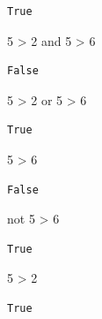 \documentclass[
  letterpaper,
  DIV=11,
  numbers=noendperiod]{scrreprt}
\newenvironment{Shaded}{\begin{snugshade}}{\end{snugshade}}
\newcommand{\DecValTok}[1]{\textcolor[rgb]{0.68,0.00,0.00}{#1}}
\newcommand{\KeywordTok}[1]{\textcolor[rgb]{0.00,0.23,0.31}{#1}}
\newcommand{\OperatorTok}[1]{\textcolor[rgb]{0.37,0.37,0.37}{#1}}
\begin{document}
\begin{verbatim}
True
\end{verbatim}

\begin{Shaded}
\begin{Highlighting}[]
\DecValTok{5} \OperatorTok{\textgreater{}} \DecValTok{2} \KeywordTok{and} \DecValTok{5} \OperatorTok{\textgreater{}} \DecValTok{6}
\end{Highlighting}
\end{Shaded}

\begin{verbatim}
False
\end{verbatim}

\begin{Shaded}
\begin{Highlighting}[]
\DecValTok{5} \OperatorTok{\textgreater{}} \DecValTok{2} \KeywordTok{or} \DecValTok{5} \OperatorTok{\textgreater{}} \DecValTok{6}
\end{Highlighting}
\end{Shaded}

\begin{verbatim}
True
\end{verbatim}

\begin{Shaded}
\begin{Highlighting}[]
\DecValTok{5} \OperatorTok{\textgreater{}} \DecValTok{6}
\end{Highlighting}
\end{Shaded}

\begin{verbatim}
False
\end{verbatim}

\begin{Shaded}
\begin{Highlighting}[]
\KeywordTok{not} \DecValTok{5} \OperatorTok{\textgreater{}} \DecValTok{6}
\end{Highlighting}
\end{Shaded}

\begin{verbatim}
True
\end{verbatim}

\begin{Shaded}
\begin{Highlighting}[]
\DecValTok{5} \OperatorTok{\textgreater{}} \DecValTok{2}
\end{Highlighting}
\end{Shaded}

\begin{verbatim}
True
\end{verbatim}
\end{document}
